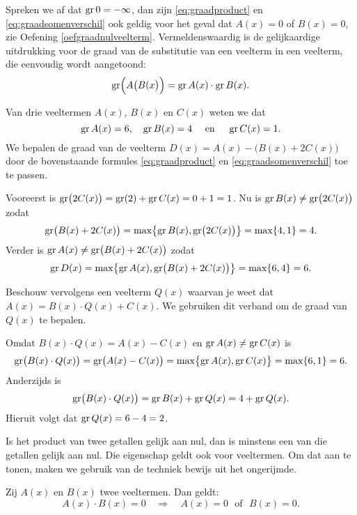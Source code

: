 \documentclass{ximera}
\begin{document}
\begin{Uitbreiding}
Spreken we af dat $\operatorname{gr} 0 = - \infty$, dan zijn \eqref{eq:graadproduct} en \eqref{eq:graadsomenverschil} ook geldig voor het geval dat $A(x) = 0$ of $B(x) = 0$, zie Oefening \ref{oefgraadnulveelterm}. Vermeldenswaardig is de gelijkaardige uitdrukking voor de graad van de substitutie van een veelterm in een veelterm, die eenvoudig wordt aangetoond:
\[
\operatorname{gr}\Bigl(A\bigl(B(x\bigr)\Bigr) = \operatorname{gr} A(x) \cdot \operatorname{gr} B(x).
\]
\end{Uitbreiding}

\begin{example} 
Van drie veeltermen $A(x)$, $B(x)$ en $C(x)$ weten we dat
\[
\operatorname{gr} A(x) = 6, \quad \operatorname{gr} B(x) = 4 \quad \text{ en } \quad \operatorname{gr} C(x) = 1.
\]
We bepalen de graad van de veelterm $D(x) = A(x) - \bigl(B(x) + 2C(x)\bigr)$ door de bovenstaande formules \eqref{eq:graadproduct} en \eqref{eq:graadsomenverschil} toe te passen. 

Vooreerst is $\operatorname{gr}\bigl(2C(x)\bigr) = \operatorname{gr}(2) + \operatorname{gr} C(x) = 0 + 1 = 1$. Nu is $\operatorname{gr} B(x) \neq \operatorname{gr}\bigl(2C(x)\bigr)$ zodat
\[
\operatorname{gr} \bigl(B(x) + 2C(x)\bigr) = \max \bigl\{\operatorname{gr} B(x),\operatorname{gr}\bigl(2C(x)\bigr)\bigr\} = \max\{4,1\} = 4.
\]
Verder is $\operatorname{gr} A(x) \neq \operatorname{gr}\bigl(B(x) + 2C(x)\bigr)$ zodat 
\[
\operatorname{gr} D(x) = \max \bigl\{\operatorname{gr} A(x),\operatorname{gr}\bigl(B(x) + 2C(x)\bigr)\bigr\} = \max\{6,4\} = 6.
\]

Beschouw vervolgens een veelterm $Q(x)$ waarvan je weet dat $A(x) = B(x)\cdot Q(x) + C(x)$. We gebruiken dit verband om de graad van $Q(x)$ te bepalen. 

Omdat $B(x)\cdot Q(x) = A(x) - C(x)$ en $\operatorname{gr} A(x) \neq \operatorname{gr} C(x)$ is
\[
\operatorname{gr}\bigl(B(x)\cdot Q(x)\bigr) = \operatorname{gr}\bigl(A(x) - C(x)\bigr) = \max \bigl\{\operatorname{gr} A(x),\operatorname{gr} C(x)\bigr\} = \max\{6,1\} = 6.
\]
Anderzijds is 
\[
\operatorname{gr}\bigl(B(x)\cdot Q(x)\bigr) = \operatorname{gr} B(x) + \operatorname{gr} Q(x) = 4 + \operatorname{gr} Q(x).
\]
Hieruit volgt dat $\operatorname{gr} Q(x) = 6-4 = 2$. 
\end{example} 

Is het product van twee getallen gelijk aan nul, dan is minstens een van die getallen gelijk aan nul. Die eigenschap geldt ook voor veeltermen. Om dat aan te tonen, maken we gebruik van de techniek bewijs uit het ongerijmde. 
	
\begin{proposition} 
Zij $A(x)$ en $B(x)$ twee veeltermen. Dan geldt: 
\[
A(x)\cdot B(x) = 0 \quad \Rightarrow \quad A(x) = 0 \,\,\text{ of } \,\, B(x) = 0.
\]
\end{proposition} 
\end{document}
